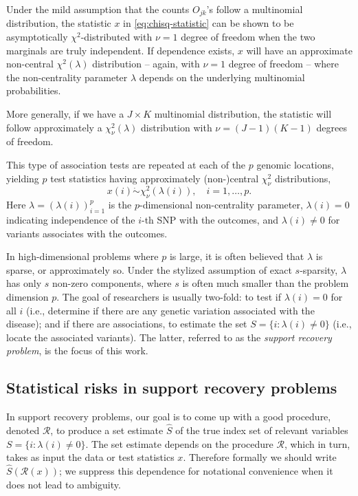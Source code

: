 Under the mild assumption that the counts $O_{jk}$'s follow a multinomial distribution, the statistic $x$ in \eqref{eq:chisq-statistic} can be shown to be asymptotically $\chi^2$-distributed with $\nu=1$ degree of freedom when the two marginals are truly independent.
If dependence exists, $x$ will have an approximate non-central $\chi^2(\lambda)$ distribution -- again, with $\nu=1$ degree of freedom -- where the non-centrality parameter $\lambda$ depends on the underlying multinomial probabilities.

More generally, if we have a $J\times K$ multinomial distribution, the statistic will follow approximately a $\chi^2_{\nu}(\lambda)$ distribution with $\nu = (J-1)(K-1)$ degrees of freedom.

This type of association tests are repeated at each of the $p$ genomic locations, yielding $p$ test statistics having approximately (non-)central $\chi^2_{\nu}$ distributions,
\begin{equation} \label{eq:model-chisquare-approx}
    x(i) \mathrel{\dot\sim} \chi_\nu^2\left(\lambda(i)\right), \quad i=1,\ldots,p.
\end{equation}
Here $\lambda = (\lambda(i))_{i=1}^p$ is the $p$-dimensional non-centrality parameter, $\lambda(i)=0$ indicating independence of the $i$-th SNP with the outcomes, and $\lambda(i)\neq0$ for variants associates with the outcomes.

In high-dimensional problems where $p$ is large, it is often believed that $\lambda$ is sparse, or approximately so.
Under the stylized assumption of exact $s$-sparsity, $\lambda$ has only $s$ non-zero components, where $s$ is often much smaller than the problem dimension $p$. 
The goal of researchers is usually two-fold: to test if $\lambda(i)=0$ for all $i$ (i.e., determine if there are any genetic variation associated with the disease); and if there are associations, to estimate the set $S=\{i:\lambda(i)\neq 0\}$ (i.e., locate the associated variants).
The latter, referred to as the \emph{support recovery problem}, is the focus of this work.

\subsection{Statistical risks in support recovery problems}
\label{subsec:risks}

In support recovery problems, our goal is to come up with a good procedure, denoted $\mathcal R$, to produce a set estimate $\widehat{S}$ of the true index set of relevant variables  $S=\{i:\lambda(i)\neq 0\}$.
The set estimate depends on the procedure $\mathcal{R}$, which in turn, takes as input the data or test statistics $x$.
Therefore formally we should write $\widehat{S}(\mathcal{R}(x))$; we suppress this dependence for notational convenience when it does not lead to ambiguity.

